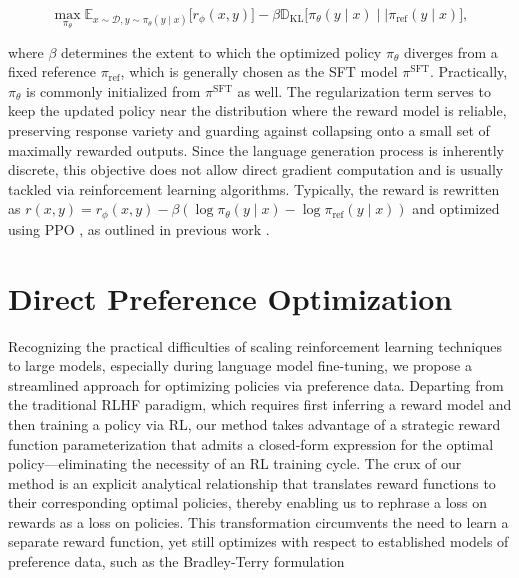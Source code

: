 \begin{equation}\label{eq:RL}
\max_{\pi_{\theta}}  \mathbb{E}_{x\sim \mathcal{D}, y\sim \pi_{\theta}(y \mid x)}\bigl[r_{\phi}(x, y)\bigr] - \beta\mathbb{D}_{\textrm{KL}}\bigl[\pi_{\theta}(y\mid x)\mid \mid \pi_\text{ref}(y\mid x)\bigr],
\end{equation}

where $\beta$ determines the extent to which the optimized policy $\pi_{\theta}$ diverges from a fixed reference $\pi_\text{ref}$, which is generally chosen as the SFT model $\pi^\text{SFT}$. Practically, $\pi_\theta$ is commonly initialized from $\pi^\text{SFT}$ as well. The regularization term serves to keep the updated policy near the distribution where the reward model is reliable, preserving response variety and guarding against collapsing onto a small set of maximally rewarded outputs. Since the language generation process is inherently discrete, this objective does not allow direct gradient computation and is usually tackled via reinforcement learning algorithms. Typically, the reward is rewritten as ${r(x, y) = r_{\phi}(x, y) -\beta (\log \pi_{\theta}(y\mid x) - \log \pi_\text{ref}(y\mid x))}$ and optimized using PPO \cite{schulman2017proximal}, as outlined in previous work \citep{ziegler2020finetuning, stiennon2022learning, bai2022training, ouyang2022training}.

\section{Direct Preference Optimization}\label{sec:DPO}

Recognizing the practical difficulties of scaling reinforcement learning techniques to large models, especially during language model fine-tuning, we propose a streamlined approach for optimizing policies via preference data. Departing from the traditional RLHF paradigm, which requires first inferring a reward model and then training a policy via RL, our method takes advantage of a strategic reward function parameterization that admits a closed-form expression for the optimal policy—eliminating the necessity of an RL training cycle. The crux of our method is an explicit analytical relationship that translates reward functions to their corresponding optimal policies, thereby enabling us to rephrase a loss on rewards as a loss on policies. This transformation circumvents the need to learn a separate reward function, yet still optimizes with respect to established models of preference data, such as the Bradley-Terry formulation

